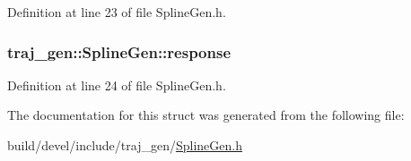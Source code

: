 Definition at line 23 of file Spline\+Gen.\+h.

\subsubsection[{\texorpdfstring{response}{response}}]{ traj\+\_\+gen\+::\+Spline\+Gen\+::response}\hypertarget{structtraj__gen_1_1_spline_gen_a241b2306f56428d950217247ab9946ec}{}\label{structtraj__gen_1_1_spline_gen_a241b2306f56428d950217247ab9946ec}


Definition at line 24 of file Spline\+Gen.\+h.



The documentation for this struct was generated from the following file\+:\begin{DoxyCompactItemize}
\item 
build/devel/include/traj\+\_\+gen/\hyperlink{_spline_gen_8h}{Spline\+Gen.\+h}\end{DoxyCompactItemize}

